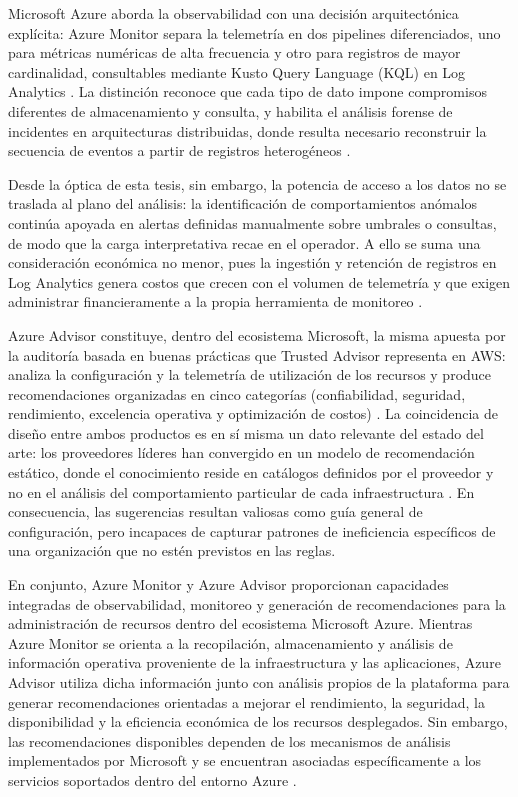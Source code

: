 Microsoft Azure aborda la observabilidad con una decisión arquitectónica explícita: Azure Monitor separa la telemetría en dos pipelines diferenciados, uno para métricas numéricas de alta frecuencia y otro para registros de mayor cardinalidad, consultables mediante Kusto Query Language (KQL) en Log Analytics \parencite{Microsoft2026}. La distinción reconoce que cada tipo de dato impone compromisos diferentes de almacenamiento y consulta, y habilita el análisis forense de incidentes en arquitecturas distribuidas, donde resulta necesario reconstruir la secuencia de eventos a partir de registros heterogéneos \parencite{Microsoft2026}.

Desde la óptica de esta tesis, sin embargo, la potencia de acceso a los datos no se traslada al plano del análisis: la identificación de comportamientos anómalos continúa apoyada en alertas definidas manualmente sobre umbrales o consultas, de modo que la carga interpretativa recae en el operador. A ello se suma una consideración económica no menor, pues la ingestión y retención de registros en Log Analytics genera costos que crecen con el volumen de telemetría y que exigen administrar financieramente a la propia herramienta de monitoreo \parencite{Microsoft2026}.

Azure Advisor constituye, dentro del ecosistema Microsoft, la misma apuesta por la auditoría basada en buenas prácticas que Trusted Advisor representa en AWS: analiza la configuración y la telemetría de utilización de los recursos y produce recomendaciones organizadas en cinco categorías (confiabilidad, seguridad, rendimiento, excelencia operativa y optimización de costos) \parencite{Microsoft2026}. La coincidencia de diseño entre ambos productos es en sí misma un dato relevante del estado del arte: los proveedores líderes han convergido en un modelo de recomendación estático, donde el conocimiento reside en catálogos definidos por el proveedor y no en el análisis del comportamiento particular de cada infraestructura \parencite{Microsoft2026}. En consecuencia, las sugerencias resultan valiosas como guía general de configuración, pero incapaces de capturar patrones de ineficiencia específicos de una organización que no estén previstos en las reglas.

En conjunto, Azure Monitor y Azure Advisor proporcionan capacidades integradas de observabilidad, monitoreo y generación de recomendaciones para la administración de recursos dentro del ecosistema Microsoft Azure. Mientras Azure Monitor se orienta a la recopilación, almacenamiento y análisis de información operativa proveniente de la infraestructura y las aplicaciones, Azure Advisor utiliza dicha información junto con análisis propios de la plataforma para generar recomendaciones orientadas a mejorar el rendimiento, la seguridad, la disponibilidad y la eficiencia económica de los recursos desplegados. Sin embargo, las recomendaciones disponibles dependen de los mecanismos de análisis implementados por Microsoft y se encuentran asociadas específicamente a los servicios soportados dentro del entorno Azure \parencite{Microsoft2026}.

